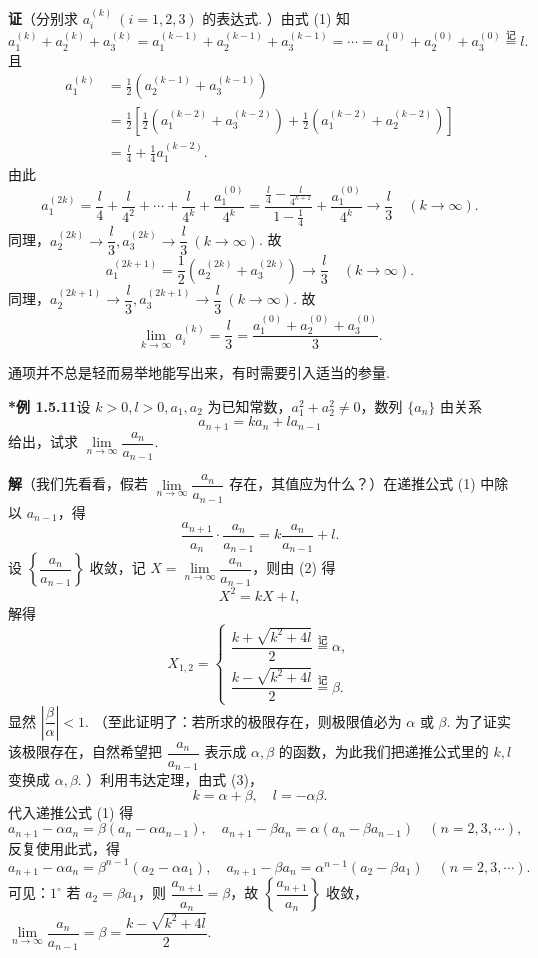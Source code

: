 \documentclass[UTF8,12pt,a4paper,fontset=fandol]{ctexart}
\begin{document}
\noindent\textbf{证}\quad （分别求 $a_i^{(k)}\ (i=1,2,3)$ 的表达式. ）由式 (1) 知
\[
  a_1^{(k)}+a_2^{(k)}+a_3^{(k)}
  =a_1^{(k-1)}+a_2^{(k-1)}+a_3^{(k-1)}
  =\cdots=a_1^{(0)}+a_2^{(0)}+a_3^{(0)}\stackrel{\text{记}}{=}l.
\]
且
\[
\begin{aligned}
  a_1^{(k)}
  &=\frac12(a_2^{(k-1)}+a_3^{(k-1)})\\
  &=\frac12\left[\frac12(a_1^{(k-2)}+a_3^{(k-2)})
    +\frac12(a_1^{(k-2)}+a_2^{(k-2)})\right]\\
  &=\frac{l}{4}+\frac14 a_1^{(k-2)}.
\end{aligned}
\]
由此
\[
  a_1^{(2k)}
  =\frac{l}{4}+\frac{l}{4^2}+\cdots+\frac{l}{4^k}
    +\frac{a_1^{(0)}}{4^k}
  =\frac{\frac{l}{4}-\frac{l}{4^{k+1}}}{1-\frac14}
    +\frac{a_1^{(0)}}{4^k}
  \to \frac{l}{3}\quad (k\to\infty).
\]
同理，$a_2^{(2k)}\to \dfrac{l}{3},a_3^{(2k)}\to \dfrac{l}{3}\ (k\to\infty)$. 故
\[
  a_1^{(2k+1)}=\frac12(a_2^{(2k)}+a_3^{(2k)})\to \frac{l}{3}\quad (k\to\infty).
\]
同理，$a_2^{(2k+1)}\to \dfrac{l}{3},a_3^{(2k+1)}\to \dfrac{l}{3}\ (k\to\infty)$. 故
\[
  \lim_{k\to\infty}a_i^{(k)}
  =\frac{l}{3}
  =\frac{a_1^{(0)}+a_2^{(0)}+a_3^{(0)}}{3}.
\]

通项并不总是轻而易举地能写出来，有时需要引入适当的参量.

\noindent\textbf{*例 1.5.11}\quad 设 $k>0,l>0,a_1,a_2$ 为已知常数，$a_1^2+a_2^2\ne 0$，数列 $\{a_n\}$ 由关系
\[
  a_{n+1}=ka_n+la_{n-1}
\tag{1}
\]
给出，试求 $\lim\limits_{n\to\infty}\dfrac{a_n}{a_{n-1}}$.

\noindent\textbf{解}\quad （我们先看看，假若 $\lim\limits_{n\to\infty}\dfrac{a_n}{a_{n-1}}$ 存在，其值应为什么？）在递推公式 (1) 中除以 $a_{n-1}$，得
\[
  \frac{a_{n+1}}{a_n}\cdot \frac{a_n}{a_{n-1}}
  =k\frac{a_n}{a_{n-1}}+l.
\tag{2}
\]
设 $\left\{\dfrac{a_n}{a_{n-1}}\right\}$ 收敛，记 $X=\lim\limits_{n\to\infty}\dfrac{a_n}{a_{n-1}}$，则由 (2) 得
\[
  X^2=kX+l,
\tag{3}
\]
解得
\[
  X_{1,2}=
  \begin{cases}
    \dfrac{k+\sqrt{k^2+4l}}{2}\stackrel{\text{记}}{=}\alpha,\\[6pt]
    \dfrac{k-\sqrt{k^2+4l}}{2}\stackrel{\text{记}}{=}\beta.
  \end{cases}
\]
显然 $\left|\dfrac{\beta}{\alpha}\right|<1$. （至此证明了：若所求的极限存在，则极限值必为 $\alpha$ 或 $\beta$. 为了证实该极限存在，自然希望把 $\dfrac{a_n}{a_{n-1}}$ 表示成 $\alpha,\beta$ 的函数，为此我们把递推公式里的 $k,l$ 变换成 $\alpha,\beta$. ）利用韦达定理，由式 (3)，
\[
  k=\alpha+\beta,\quad l=-\alpha\beta.
\]
代入递推公式 (1) 得
\[
  a_{n+1}-\alpha a_n=\beta(a_n-\alpha a_{n-1}),\quad
  a_{n+1}-\beta a_n=\alpha(a_n-\beta a_{n-1})\quad (n=2,3,\cdots),
\]
反复使用此式，得
\[
  a_{n+1}-\alpha a_n=\beta^{n-1}(a_2-\alpha a_1),\quad
  a_{n+1}-\beta a_n=\alpha^{n-1}(a_2-\beta a_1)\quad (n=2,3,\cdots).
\tag{4}
\]
可见：$1^\circ$ 若 $a_2=\beta a_1$，则 $\dfrac{a_{n+1}}{a_n}=\beta$，故 $\left\{\dfrac{a_{n+1}}{a_n}\right\}$ 收敛，$\lim\limits_{n\to\infty}\dfrac{a_n}{a_{n-1}}=\beta=\dfrac{k-\sqrt{k^2+4l}}{2}$.
\end{document}
